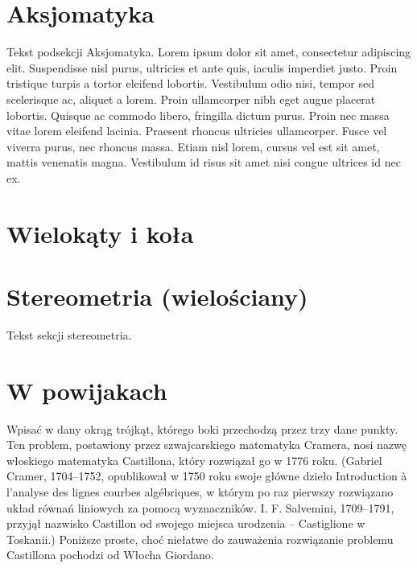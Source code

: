 \documentclass{greaseproof}
\newcommand{\loremipsum}{ {\color{gray}  Lorem ipsum dolor sit amet, consectetur adipiscing elit. Suspendisse nisl purus, ultricies et ante quis, iaculis imperdiet justo. Proin tristique turpis a tortor eleifend lobortis. Vestibulum odio nisi, tempor sed scelerisque ac, aliquet a lorem. Proin ullamcorper nibh eget augue placerat lobortis. Quisque ac commodo libero, fringilla dictum purus. Proin nec massa vitae lorem eleifend lacinia. Praesent rhoncus ultricies ullamcorper. Fusce vel viverra purus, nec rhoncus massa. Etiam nisl lorem, cursus vel est sit amet, mattis venenatis magna. Vestibulum id risus sit amet nisi congue ultrices id nec ex. } }
\begin{document}


\section{Aksjomatyka}
Tekst podsekcji Aksjomatyka. \loremipsum






\section{Wielokąty i koła}









\section{Stereometria (wielościany)}
Tekst sekcji stereometria.

\section{W powijakach}

Wpisać w dany okrąg trójkąt, którego boki przechodzą przez trzy dane punkty.
Ten problem, postawiony przez szwajcarskiego matematyka Cramera, nosi nazwę włoskiego matematyka Castillona, który rozwiązał go w 1776 roku.
(Gabriel Cramer, 1704–1752, opublikował w 1750 roku swoje główne dzieło Introduction à l’analyse des lignes courbes algébriques, w którym po raz pierwszy rozwiązano układ równań liniowych za pomocą wyznaczników.
I. F. Salvemini, 1709–1791, przyjął nazwisko Castillon od swojego miejsca urodzenia – Castiglione w Toskanii.)
Poniższe proste, choć niełatwe do zauważenia rozwiązanie problemu Castillona pochodzi od Włocha Giordano.
\end{document}
